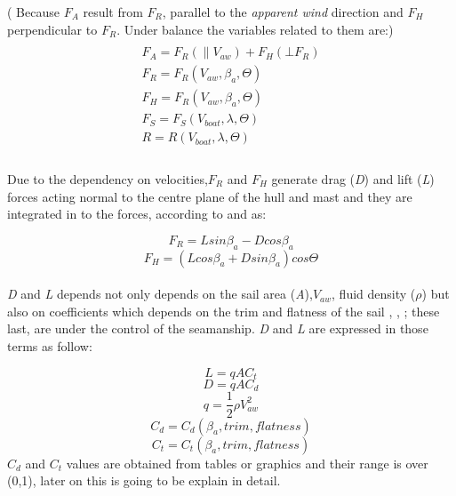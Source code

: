 ( Because $F_{A}$ result from $F_{R}$, parallel to the \textit{apparent wind} direction and $F_{H}$ perpendicular to $F_{R}$. Under balance the variables related to them are:)
\begin{multline}
\\
F_{A}=F_{R}(\parallel V_{aw}) + F_{H}(\bot F_{R} )\\
F_{R}=F_{R}(V_{aw},\beta_{a}, \Theta) \\
F_{H}=F_{R}(V_{aw},\beta_{a}, \Theta) \\
F_{S}=F_{S}(V_{boat},\lambda, \Theta) \\
R=R(V_{boat},\lambda, \Theta)\\  
\end{multline}
\\
Due to the dependency on velocities,$F_{R}$ and $F_{H}$ generate drag (\textit{D}) and lift (\textit{L}) forces acting normal to the centre plane of the hull and mast and they are integrated in to the forces, according to \cite{philpott1993yacht} and \cite{claughton1998sailing} as: \par 
\begin{equation} \label{eq:Fr_LD}
    F_{R}=L sin \beta_{a} - D cos \beta_{a}
\end{equation}
\begin{equation} \label{eq:Fh_LD}
    F_{H}=(L cos \beta_{a} + D sin \beta_{a}) cos\Theta
\end{equation}
\\ \textit{D} and \textit{L} depends not only depends on  the sail area (\textit{A}),$V_{aw}$, fluid density ($\rho$) but also on coefficients which depends on the trim and flatness of the sail \cite{philpott1993yacht}, \cite{carrico17symp}, \cite{day2017performance}; these last, are under the control of the seamanship. \textit{D} and \textit{L}  are expressed in those terms as follow: \par
\begin{equation} \label{eq:Lift}
  L=qAC_{t}  
\end{equation}
\begin{equation} \label{eq:Draf}
    D=qAC_{d}  
\end{equation}
\begin{equation} \label{eq:dynamic_press}
    q=\frac{1}{2}\rho V_{aw}^2
\end{equation}
\begin{equation} \label{eq:Cd}
    C_{d}=C_{d}(\beta_{a},trim, flatness)
\end{equation}
\begin{equation} \label{eq:Ct}
    C_{t}=C_{t}(\beta_{a},trim, flatness)
\end{equation}
$C_{d}$ and $C_{t}$ values are obtained from tables or graphics and their range is over (0,1), later on this is going to be explain in detail. 
